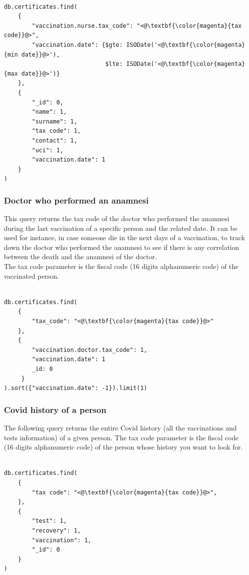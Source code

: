 \documentclass{article}
\begin{document}
\begin{lstlisting}[language=cypher, label=lst:cypher-example]

db.certificates.find(
    {
        "vaccination.nurse.tax_code": "<@\textbf{\color{magenta}{tax code}}@>",
        "vaccination.date": {$gte: ISODate('<@\textbf{\color{magenta}{min date}}@>'),
                             $lte: ISODate('<@\textbf{\color{magenta}{max date}}@>')}
    },
    {
        "_id": 0,
        "name": 1,
        "surname": 1,
        "tax code": 1,
        "contact": 1,
        "uci": 1,
        "vaccination.date": 1
    }
)

\end{lstlisting}

\subsubsection{Doctor who performed an anamnesi}
This query returns the tax code of the doctor who performed the anamnesi during the last vaccination of a specific person and the related date.
It can be used for instance, in case someone die in the next days of a vaccination, to track down the doctor who performed the anamnesi to see if there is any correlation between the death and the anamnesi of the doctor.\\
The tax code parameter is the fiscal code (16 digits alphanumeric code) of the vaccinated person.

\begin{lstlisting}[language=cypher, label=lst:cypher-example]

db.certificates.find(
    {
        "tax_code": "<@\textbf{\color{magenta}{tax code}}@>"
    },
    {
        "vaccination.doctor.tax_code": 1,
        "vaccination.date": 1
        _id: 0
     }
).sort({"vaccination.date": -1}).limit(1)

\end{lstlisting}
\subsubsection{Covid history of a person}
The following query returns the entire Covid history (all the vaccinations and tests information) of a given person.
The tax code parameter is the fiscal code (16 digits alphanumeric code) of the person whose history you want to look for.

\begin{lstlisting}[language=cypher, label=lst:cypher-example]

db.certificates.find(
    {
        "tax code": "<@\textbf{\color{magenta}{tax code}}@>",
    },
    {
        "test": 1,
        "recovery": 1,
        "vaccination": 1,
        "_id": 0
    }
)

\end{lstlisting}
\end{document}
